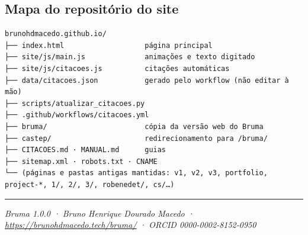 \documentclass[
  10pt,
]{article}
\begin{document}
\hypertarget{mapa-do-reposituxf3rio-do-site}{%
\subsection{Mapa do repositório do
site}\label{mapa-do-reposituxf3rio-do-site}}

\begin{verbatim}
brunohdmacedo.github.io/
├── index.html                   página principal
├── site/js/main.js              animações e texto digitado
├── site/js/citacoes.js          citações automáticas
├── data/citacoes.json           gerado pelo workflow (não editar à mão)
├── scripts/atualizar_citacoes.py
├── .github/workflows/citacoes.yml
├── bruma/                       cópia da versão web do Bruma
├── castep/                      redirecionamento para /bruma/
├── CITACOES.md · MANUAL.md      guias
├── sitemap.xml · robots.txt · CNAME
└── (páginas e pastas antigas mantidas: v1, v2, v3, portfolio, project-*, 1/, 2/, 3/, robenedet/, cs/…)
\end{verbatim}

\begin{center}\rule{0.5\linewidth}{0.5pt}\end{center}

\emph{Bruma 1.0.0 · Bruno Henrique Dourado Macedo ·
\url{https://brunohdmacedo.tech/bruma/} · ORCID 0000-0002-8152-0950}
\end{document}
